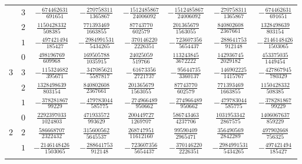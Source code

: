 \begin{table}
\begin{center}
\begin{tabular}{cccccccc}
           &  $3$  &  $-\frac{ 674462631}{  691651}$  &  $-\frac{ 270758311}{ 1365867}$  &  $-\frac{1512485867}{24006092}$  &  $-\frac{1512485867}{24006092}$  &  $-\frac{ 270758311}{ 1365867}$  &  $-\frac{ 674462631}{  691651}$  \\ \addlinespace
           &  $2$  &  $ \frac{1150428332}{  508385}$  &  $ \frac{ 771393469}{ 1663855}$  &  $ \frac{  87743770}{  602579}$  &  $ \frac{ 201365679}{ 1563055}$  &  $ \frac{ 840802608}{ 2367661}$  &  $ \frac{1328498639}{  803154}$  \\ \addlinespace
           &  $1$  &  $-\frac{ 497421494}{  185427}$  &  $-\frac{2984991531}{ 5434265}$  &  $-\frac{ 370146220}{ 2226351}$  &  $-\frac{ 723607356}{ 5654437}$  &  $-\frac{ 288641753}{  912148}$  &  $-\frac{2146148426}{ 1503065}$  \\ \addlinespace
           &  $0$  &  $ \frac{ 498196769}{  609968}$  &  $ \frac{ 169505788}{ 1035915}$  &  $ \frac{  24025059}{  519766}$  &  $ \frac{ 113243845}{ 3672222}$  &  $ \frac{ 142936745}{ 2029182}$  &  $ \frac{ 453375035}{ 1449454}$  \\ \addlinespace
      $3$  &  $3$  &  $-\frac{ 115324682}{  395671}$  &  $-\frac{ 347085621}{ 5587817}$  &  $-\frac{  61673356}{ 2721737}$  &  $-\frac{  95644735}{ 3360137}$  &  $-\frac{ 146902225}{ 1415767}$  &  $-\frac{ 427867945}{  780329}$  \\ \addlinespace
           &  $2$  &  $ \frac{1328498639}{  803154}$  &  $ \frac{ 840802608}{ 2367661}$  &  $ \frac{ 201365679}{ 1563055}$  &  $ \frac{  87743770}{  602579}$  &  $ \frac{ 771393469}{ 1663855}$  &  $ \frac{1150428332}{  508385}$  \\ \addlinespace
           &  $1$  &  $-\frac{ 378281867}{   99229}$  &  $-\frac{ 479783044}{  585775}$  &  $-\frac{ 274966489}{  950662}$  &  $-\frac{ 274966489}{  950662}$  &  $-\frac{ 479783044}{  585775}$  &  $-\frac{ 378281867}{   99229}$  \\ \addlinespace
           &  $0$  &  $ \frac{2292397033}{ 1024803}$  &  $ \frac{ 471933572}{  993629}$  &  $ \frac{ 200449727}{ 1269707}$  &  $ \frac{ 586743463}{ 4237706}$  &  $ \frac{1031953342}{ 2867575}$  &  $ \frac{1406067637}{  859229}$  \\ \addlinespace
      $2$  &  $2$  &  $ \frac{ 586668707}{ 2322432}$  &  $ \frac{ 315600562}{ 5645537}$  &  $ \frac{ 268747951}{11612160}$  &  $ \frac{  99590409}{ 2965471}$  &  $ \frac{ 356490569}{ 2842289}$  &  $ \frac{ 497902668}{  756325}$  \\ \addlinespace
           &  $1$  &  $-\frac{2146148426}{ 1503065}$  &  $-\frac{ 288641753}{  912148}$  &  $-\frac{ 723607356}{ 5654437}$  &  $-\frac{ 370146220}{ 2226351}$  &  $-\frac{2984991531}{ 5434265}$  &  $-\frac{ 497421494}{  185427}$  \\ \addlinespace

\end{tabular}
\end{center}
\end{table}
